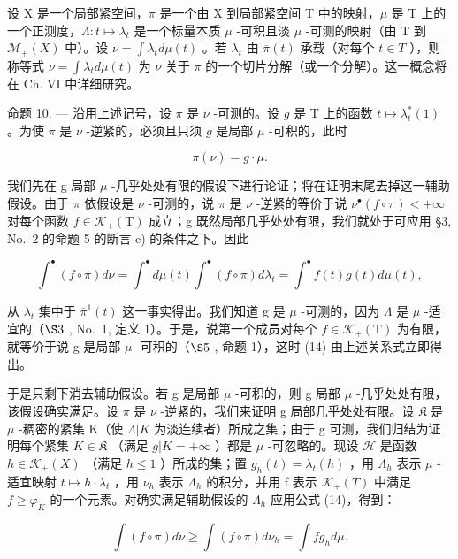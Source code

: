 设 X 是一个局部紧空间，\(\pi\) 是一个由 X 到局部紧空间 T 中的映射，\(\mu\) 是 T 上的一个正测度，\(\Lambda: t \mapsto \lambda_t\) 是一个标量本质 \(\mu\) -可积且淡 \(\mu\) -可测的映射（由 T 到 \(\mathcal{M}_{+}(X)\) 中）。设 \(\nu = \int \lambda_t d\mu(t)\) 。若 \(\lambda_t\) 由 \(\overline{\pi}(t)\) 承载（对每个 \(t \in T\) ），则称等式 \(\nu = \int \lambda_t d\mu(t)\) 为 \(\nu\) 关于 \(\pi\) 的一个切片分解（或一个分解）。这一概念将在 Ch. VI 中详细研究。

命题 10. --- 沿用上述记号，设 \(\pi\) 是 \(\nu\) -可测的。设 \(g\) 是 T 上的函数 \(t \mapsto \lambda_t^*(1)\) 。为使 \(\pi\) 是 \(\nu\) -逆紧的，必须且只须 \(g\) 是局部 \(\mu\) -可积的，此时

\[
\pi (\nu) = g \cdot \mu .\tag{14}
\]

我们先在 g 局部 \(\mu\) -几乎处处有限的假设下进行论证；将在证明末尾去掉这一辅助假设。由于 \(\pi\) 依假设是 \(\nu\) -可测的，说 \(\pi\) 是 \(\nu\) -逆紧的等价于说 \(\nu^{\bullet}(f\circ\pi)<+\infty\) 对每个函数 \(f\in\mathcal{K}_{+}(\mathrm{T})\) 成立；g 既然局部几乎处处有限，我们就处于可应用 §3, No.~2 的命题 5 的断言 c) 的条件之下。因此

\[
\int^ {\bullet} (f \circ \pi) d \nu = \int^ {\bullet} d \mu (t) \int^ {\bullet} (f \circ \pi) d \lambda_ {t} = \int^ {\bullet} f (t) g (t) d \mu (t),
\]

从 \(\lambda_{t}\) 集中于 \(\overline{\pi}^{1}(t)\) 这一事实得出。我们知道 g 是 \(\mu\) -可测的，因为 \(\Lambda\) 是 \(\mu\) -适宜的（\(\S3\) , No.~1, 定义 1）。于是，说第一个成员对每个 \(f \in \mathcal{K}_{+}(\mathrm{T})\) 为有限，就等价于说 g 是局部 \(\mu\) -可积的（\(\S5\) , 命题 1），这时 (14) 由上述关系式立即得出。

于是只剩下消去辅助假设。若 g 是局部 \(\mu\) -可积的，则 g 局部 \(\mu\) -几乎处处有限，该假设确实满足。设 \(\pi\) 是 \(\nu\) -逆紧的，我们来证明 g 局部几乎处处有限。设 \(\mathfrak{K}\) 是 \(\mu\) -稠密的紧集 K（使 \(\Lambda|K\) 为淡连续者）所成之集；由于 g 可测，我们归结为证明每个紧集 \(K \in \mathfrak{K}\) （满足 \(g|K = +\infty\) ）都是 \(\mu\) -可忽略的。现设 \(\mathcal{H}\) 是函数 \(h \in \mathcal{K}_{+}(X)\) （满足 \(h \leqslant 1\) ）所成的集；置 \(g_{h}(t) = \lambda_{t}(h)\) ，用 \(\Lambda_{h}\) 表示 \(\mu\) -适宜映射 \(t \mapsto h \cdot \lambda_{t}\) ，用 \(\nu_{h}\) 表示 \(\Lambda_{h}\) 的积分，并用 f 表示 \(\mathcal{K}_{+}(T)\) 中满足 \(f \geqslant \varphi_{K}\) 的一个元素。对确实满足辅助假设的 \(\Lambda_{h}\) 应用公式 (14)，得到：

\[
\int (f \circ \pi) d \nu \geqslant \int (f \circ \pi) d \nu_ {h} = \int f g _ {h} d \mu .
\]

